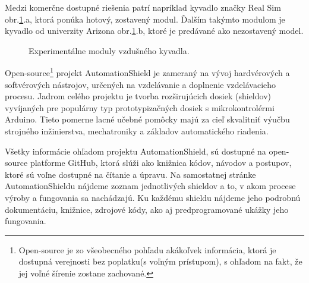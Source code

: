 Medzi komerčne dostupné riešenia patrí napríklad kyvadlo značky Real Sim obr.\ref{OBRAZOK 1.2}.a, ktorá ponúka hotový, zostavený modul. Ďalším takýmto modulom je kyvadlo od univerzity Arizona\cite{enikov_campa_2012} obr.\ref{OBRAZOK 1.2}.b, ktoré je predávané ako nezostavený model. 

\begin{figure}[!tbh]
	\hfill
	\hfill
	\hfill
	\caption{Experimentálne moduly vzdušného kyvadla.}\label{OBRAZOK 1.2}
\end{figure}

\newpage
Open-source\footnote[1]{Open-source je zo všeobecného pohľadu akákoľvek informácia, ktorá je dostupná verejnosti bez poplatku(s voľným prístupom), s ohľadom na fakt, že jej voľné šírenie zostane zachované.} projekt AutomationShield je zameraný na vývoj hardvérových a softvérových nástrojov, určených na vzdelávanie a doplnenie vzdelávacieho procesu. Jadrom celého projektu je tvorba rozširujúcich dosiek (shieldov) vyvíjaných pre populárny typ prototypizačných dosiek s mikrokontrolérmi Arduino. Tieto pomerne lacné učebné pomôcky majú za cieľ skvalitniť výučbu strojného inžinierstva, mechatroniky a základov automatického riadenia\cite{Auto}.

Všetky informácie ohľadom projektu AutomationShield, sú dostupné na open-source platforme GitHub\cite{Git}, ktorá slúži ako knižnica kódov, návodov a postupov, ktoré sú voľne dostupné na čítanie a úpravu. Na samostatnej stránke AutomationShieldu nájdeme zoznam jednotlivých shieldov a to, v akom procese výroby a fungovania sa nachádzajú. Ku každému shieldu nájdeme jeho podrobnú dokumentáciu, knižnice, zdrojové kódy, ako aj predprogramované ukážky jeho fungovania. 

